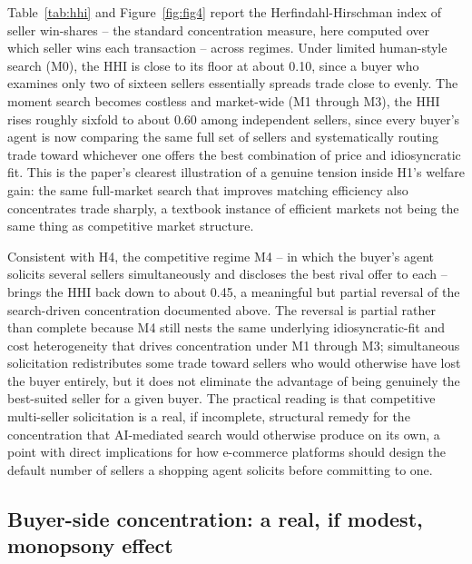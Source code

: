 \documentclass[review]{elsarticle}
\begin{document}
Table~\ref{tab:hhi} and Figure~\ref{fig:fig4} report the Herfindahl-Hirschman index of seller win-shares -- the standard concentration measure, here computed over which seller wins each transaction -- across regimes. Under limited human-style search (M0), the HHI is close to its floor at about 0.10, since a buyer who examines only two of sixteen sellers essentially spreads trade close to evenly. The moment search becomes costless and market-wide (M1 through M3), the HHI rises roughly sixfold to about 0.60 among independent sellers, since every buyer's agent is now comparing the same full set of sellers and systematically routing trade toward whichever one offers the best combination of price and idiosyncratic fit. This is the paper's clearest illustration of a genuine tension inside H1's welfare gain: the same full-market search that improves matching efficiency also concentrates trade sharply, a textbook instance of efficient markets not being the same thing as competitive market structure.

Consistent with H4, the competitive regime M4 -- in which the buyer's agent solicits several sellers simultaneously and discloses the best rival offer to each -- brings the HHI back down to about 0.45, a meaningful but partial reversal of the search-driven concentration documented above. The reversal is partial rather than complete because M4 still nests the same underlying idiosyncratic-fit and cost heterogeneity that drives concentration under M1 through M3; simultaneous solicitation redistributes some trade toward sellers who would otherwise have lost the buyer entirely, but it does not eliminate the advantage of being genuinely the best-suited seller for a given buyer. The practical reading is that competitive multi-seller solicitation is a real, if incomplete, structural remedy for the concentration that AI-mediated search would otherwise produce on its own, a point with direct implications for how e-commerce platforms should design the default number of sellers a shopping agent solicits before committing to one.

\FloatBarrier
\subsection{Buyer-side concentration: a real, if modest, monopsony effect}
\label{sec:results-buyerconc}
\end{document}
